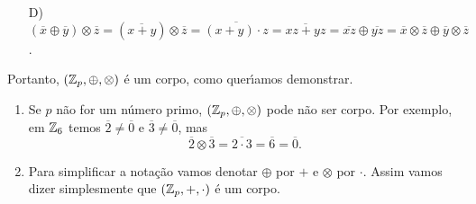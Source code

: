 \begin{prova}
\begin{enumerate}
\begin{align*}
	&\overline{xy} \oplus \overline{pz} = \overline{1}\\
	&\overline{x} \otimes \overline{y} + \overline{p} \otimes \overline{z} = \overline{1}\\
	&\overline{x} \otimes \overline{y} = \overline{1}
	\end{align*}
	uma vez que $\overline{p} = \overline{0}$. Como $\overline{y}$ \'e obtido pelo resto da divis\~ao inteira de $y$ por $p$, ent\~ao 
	$\overline{y} \in \integer_p$. Observe que $y \ne 0$ pois $p \ge 2$ e $y \ne p$ pois sen\~ao $(a + p)y = 1$ o que \'e imposs{\'\i}vel uma vez que $p \ge 2$. Logo $\overline{y} \ne 0$ e assim todo elemento $\overline{x} \in \integer_p$ possui inverso multiplicativo.
	\item[D)] $(\overline{x} \oplus \overline{y}) \otimes \overline{z}= (\overline{x + y}) \otimes \overline{z} = \overline{(x + y) \cdot z} = \overline{xz + yz} = \overline{xz} \oplus \overline{yz} = \overline{x} \otimes \overline{z} \oplus \overline{y} \otimes \overline{z}$.
\end{enumerate}
Portanto, $(\mathbb{Z}_p, \oplus, \otimes)$ \'e um corpo, como quer{\'\i}amos demonstrar.
\end{prova}

\begin{observacao}
\begin{enumerate}
	\item Se $p$ n\~ao for um n\'umero primo, $(\mathbb{Z}_p, \oplus, \otimes)$ pode n\~ao ser corpo. Por exemplo, em $\mathbb{Z}_6$ temos $\overline{2} \ne \overline{0}$ e $\overline{3} \ne \overline{0}$, mas
	\[
	\overline{2}\otimes \overline{3} = \overline{2\cdot 3} = \overline{6} = \overline{0}.
	\]

	\item Para simplificar a nota\c{c}\~ao vamos denotar $\oplus$ por $+$ e $\otimes$ por $\cdot$. Assim vamos dizer simplesmente que $(\mathbb{Z}_p, +, \cdot)$ \'e um corpo.
\end{enumerate}
\end{observacao}


